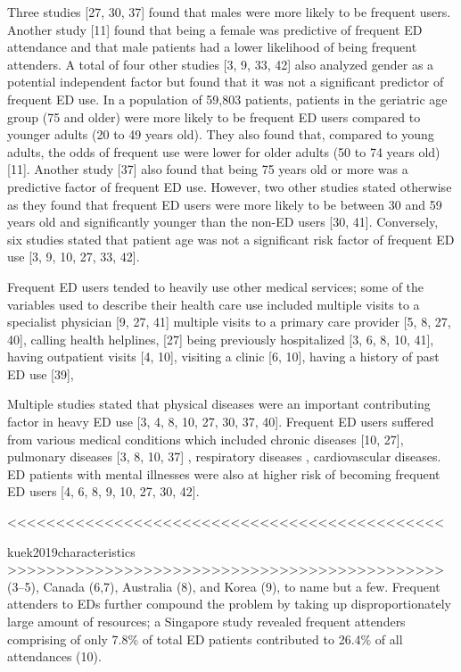 Three studies [27, 30, 37] found that males were more likely to be frequent users. Another study [11] found that being a female was predictive of frequent ED attendance and that male patients had a lower likelihood of being frequent attenders. A total of four other studies [3, 9, 33, 42] also analyzed gender as a potential independent factor but found that it was not a significant predictor of frequent ED use.
In a population of 59,803 patients, patients in the geriatric age group (75 and older) were more likely to be frequent ED users compared to younger adults (20 to 49 years old). They also found that, compared to young adults, the odds of frequent use were lower for older adults (50 to 74 years old) [11]. Another study [37] also found that being 75 years old or more was a predictive factor of frequent ED use. However, two other studies stated otherwise as they found that frequent ED users were more likely to be between 30 and 59 years old and significantly younger than the non-ED users [30, 41]. Conversely, six studies stated that patient age was not a significant risk factor of frequent ED use [3, 9, 10, 27, 33, 42].


Frequent ED users tended to heavily use other medical services; some of the variables used to describe their health care use included multiple visits to a specialist physician [9, 27, 41] multiple visits to a primary care provider [5, 8, 27, 40], calling health helplines, [27] being previously hospitalized [3, 6, 8, 10, 41], having outpatient visits [4, 10], visiting a clinic [6, 10], having a history of past ED use [39],

Multiple studies stated that physical diseases were an important contributing factor in heavy ED use [3, 4, 8, 10, 27, 30, 37, 40]. Frequent ED users suffered from various medical conditions which included chronic diseases [10, 27], pulmonary diseases [3, 8, 10, 37] , respiratory diseases , cardiovascular diseases. ED patients with mental illnesses were also at higher risk of becoming frequent ED users [4, 6, 8, 9, 10, 27, 30, 42].  


<<<<<<<<<<<<<<<<<<<<<<<<<<<<<<<<<<<<<<<<<<<<<



kuek2019characteristics
>>>>>>>>>>>>>>>>>>>>>>>>>>>>>>>>>>>>>>>>>>>>>
(3–5), Canada (6,7), Australia (8), and Korea (9), to name but a few. Frequent attenders to EDs further compound the problem  by  taking  up  disproportionately  large amount of resources; a Singapore study revealed frequent attenders comprising of only 7.8\% of total ED patients contributed to 26.4\% of all attendances (10).




